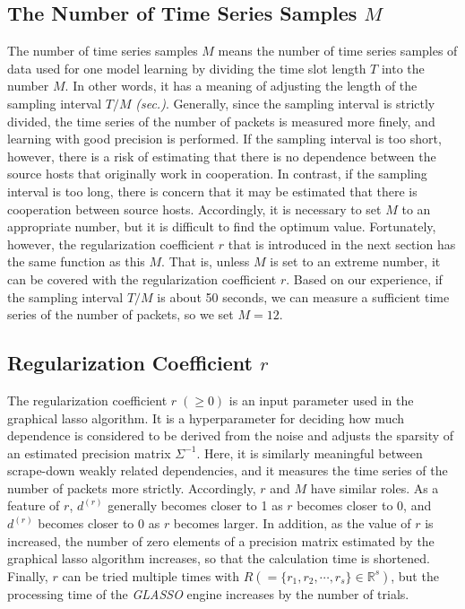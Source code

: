 \documentclass[conference]{IEEEtran}
\begin{document}
\subsection{The Number of Time Series Samples $M$}
The number of time series samples $M$ means the number of time series samples of data used for one model learning by dividing the time slot length $T$ into the number $M$.
In other words, it has a meaning of adjusting the length of the sampling interval $T/M$ {\it (sec.)}.
Generally, since the sampling interval is strictly divided, the time series of the number of packets is measured more finely, and learning with good precision is performed.
If the sampling interval is too short, however, there is a risk of estimating that there is no dependence between the source hosts that originally work in cooperation.
In contrast, if the sampling interval is too long, there is concern that it may be estimated that there is cooperation between source hosts.
Accordingly, it is necessary to set $M$ to an appropriate number, but it is difficult to find the optimum value.
Fortunately, however, the regularization coefficient $r$ that is introduced in the next section has the same function as this $M$.
That is, unless $M$ is set to an extreme number, it can be covered with the regularization coefficient $r$.
Based on our experience, if the sampling interval $T/M$ is about 50 seconds, we can measure a sufficient time series of the number of packets, so we set $M=12$.





\subsection{Regularization Coefficient $r$}
The regularization coefficient $r\;(\geq 0)$ is an input parameter used in the graphical lasso algorithm.
It is a hyperparameter for deciding how much dependence is considered to be derived from the noise and adjusts the sparsity of an estimated precision matrix $\Sigma^{-1}$.
Here, it is similarly meaningful between scrape-down weakly related dependencies, and it measures the time series of the number of packets more strictly.
Accordingly, $r$ and $M$ have similar roles.
As a feature of $r$, $d^{(r)}$ generally becomes closer to 1 as $r$ becomes closer to 0, and $d^{(r)}$ becomes closer to 0 as $r$ becomes larger.
In addition, as the value of $r$ is increased, the number of zero elements of a precision matrix estimated by the graphical lasso algorithm increases, so that the calculation time is shortened.
Finally, $r$ can be tried multiple times with $R ( = \{r_1, r_2, \cdots, r_s\}\in\mathbb{R}^s)$, but the processing time of the {\it GLASSO} engine increases by the number of trials.
\end{document}
